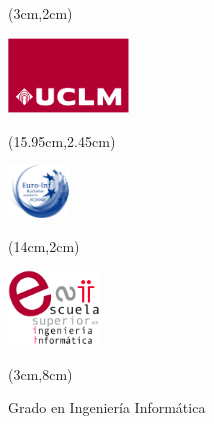 %
% 


\cleardoublepage
\setcounter{page}{1} \null
\begin{textblock*}{3cm}(3cm,2cm) 
\begin{flushleft}
\includegraphics[height=2cm]{figs/logouclm.png}
\end{flushleft}
\end{textblock*}


\begin{textblock*}{2.5cm}(15.95cm,2.45cm) 
\begin{flushright}
\includegraphics[height=1.4cm]{figs/euroinf.jpg}
\end{flushright}
\end{textblock*}

\begin{textblock*}{2cm}(14cm,2cm)  %
\begin{flushright}
\includegraphics[height=2cm]{figs/logoesii.png}
\end{flushright}
\end{textblock*}



\begin{textblock*}{\textwidth}(3cm,8cm) 
\begin{center}\doublespacing 
{\fontsize{18pt}{4pt}\selectfont {}}

\medskip
{\fontsize{18pt}{4pt}\selectfont Grado en Ingeniería Informática}

\medskip
{\fontsize{16pt}{4pt}\selectfont \espec}
\end{center}
\end{textblock*}


